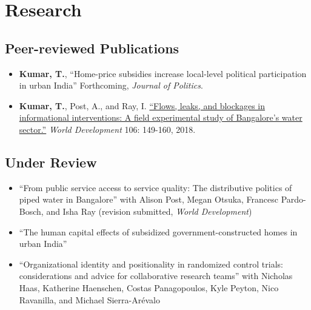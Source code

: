 \documentclass[11pt]{article}
\begin{document}
	
\vspace{2mm}

\section*{Research}



\subsection*{Peer-reviewed Publications}
\begin{itemize}
			\item[] \textbf{Kumar, T.}, ``Home-price subsidies increase local-level political participation in urban India'' Forthcoming, \textit{Journal of Politics}.
					\item[] \textbf{Kumar, T.}, Post, A., and Ray, I. \href{https://www.sciencedirect.com/science/article/pii/S0305750X1830032}{``Flows, leaks, and blockages in informational interventions: A field experimental study of Bangalore's water sector.''} \textit{World Development} 106: 149-160, 2018.
		
		

\end{itemize}

\subsection*{Under Review}

\begin{itemize}

\item[]``From public service access to service quality: The distributive politics of piped water in Bangalore'' with Alison Post, Megan Otsuka, Francesc Pardo-Bosch, and Isha Ray (revision submitted, \textit{World Development})
	

	\item[]``The human capital effects of subsidized government-constructed homes in urban India'' 

	\item[]``Organizational identity and positionality in randomized control trials: considerations and advice for collaborative research teams'' with Nicholas Haas, Katherine Haenschen, Costas Panagopoulos, Kyle Peyton, Nico Ravanilla, and Michael  Sierra-Ar\'{e}valo
		
		\end{itemize}
		
\end{document}
